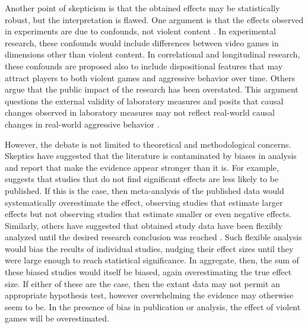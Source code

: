 \documentclass[man]{apa6}
\begin{document}
Another point of skepticism is that the obtained effects may be statistically robust, but the interpretation is flawed. One argument is that the effects observed in experiments are due to confounds, not violent content \citep{Adachi:Willoughby:2011b;Elson:etal:2013}. In experimental research, these confounds would include differences between video games in dimensions other than violent content. In correlational and longitudinal research, these confounds are proposed also to include dispositional features that may attract players to both violent games and aggressive behavior over time.
Others argue that the public impact of the research has been overstated. This argument questions the external validity of laboratory measures and posits that causal changes observed in laboratory measures may not reflect real-world causal changes in real-world aggressive behavior \citep{Elson:Ferguson:2014}. %

However, the debate is not limited to theoretical and methodological concerns.  
Skeptics have suggested that the literature is contaminated by biases in analysis and report that make the evidence appear stronger than it is. For example,  \citet{Ferguson:2007a} suggests that studies that do not find significant effects are less likely to be published. If this is the case, then meta-analysis of the published data would systematically overestimate the effect, observing studies that estimate larger effects but not observing studies that estimate smaller or even negative effects. 
Similarly, others have suggested that obtained study data have been flexibly analyzed until the desired research conclusion was reached \citep{Elson:etal:2014;Ferguson:CITATION:NEEDED}. Such flexible analysis would bias the results of individual studies, nudging their effect sizes until they were large enough to reach statistical significance. In aggregate, then, the sum of these biased studies would itself be biased, again overestimating the true effect size.
If either of these are the case, then the extant data may not permit an appropriate hypothesis test, however overwhelming the evidence may otherwise seem to be. In the presence of bias in publication or analysis, the effect of violent games will be overestimated.
\end{document}
